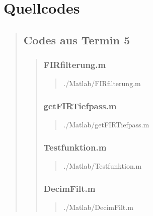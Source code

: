 \section{Quellcodes}
\begin{quote}

	\subsection{Codes aus Termin 5}
	\begin{quote}
	    \subsubsection{FIRfilterung.m}
	    \begin{quote}
	        
	            {./Matlab/FIRfilterung.m}
	    \end{quote}
	    
	    \subsubsection{getFIRTiefpass.m}
	    \begin{quote}
	        
	            {./Matlab/getFIRTiefpass.m}
	    \end{quote}

        \subsubsection{Testfunktion.m}
        \begin{quote}
            
                {./Matlab/Testfunktion.m}
        \end{quote}
	    
	    \subsubsection{DecimFilt.m}
	    \begin{quote}
	        
	            {./Matlab/DecimFilt.m}
	    \end{quote}
	    
	\end{quote}
\end{quote}

